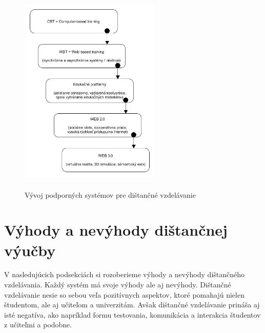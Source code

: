 \documentclass[10pt,oneside,slovak,a4paper]{article}
\begin{document}
\begin{figure}[h]
	\centering
	\includegraphics[scale=0.15, height=100mm,width=0.6\textwidth]{Dev_Of_SupSys_DE.jpg}
	\caption{Vývoj podporných systémov pre dištančné vzdelávanie\cite{WiktorzakKotowski}}
	\label{Vyvoj_podp_sys_DE}
\end{figure}


\section{Výhody a nevýhody dištančnej výučby}
V nasledujúcich podsekciách si rozoberieme výhody a nevýhody dištančného vzdelávania\cite{Sokolova2018}. Každý systém má svoje výhody ale aj nevýhody. Dištančné vzdelávanie nesie so sebou veľa pozitívnych aspektov, ktoré pomahajú nielen študentom, ale aj učiteľom a univerzitám. Avšak dištančné vzdelávanie prináša aj isté negatíva, ako napríklad formu testovania, komunikácia a interakcia študentov z učiteľmi a podobne. 
\end{document}
